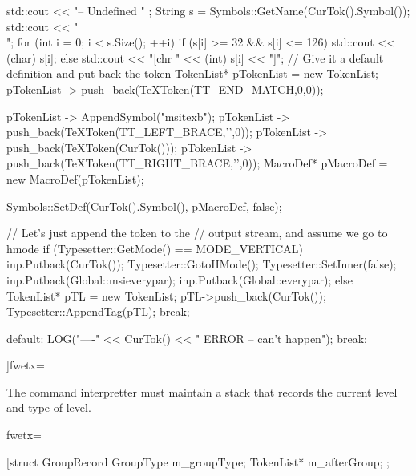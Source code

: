 {{{{{        std::cout << "\n-- Undefined " ;
        String s = Symbols::GetName(CurTok().Symbol());
        std::cout << "\\";
        for (int i = 0; i < s.Size(); ++i){
          if (s[i] >= 32 && s[i] <= 126){
             std::cout << (char) s[i];
          } else {
             std::cout << "[chr " << (int) s[i] << "]";
          }
        }
        // Give it a default definition and put back the token
        TokenList* pTokenList = new TokenList;
        pTokenList -> push_back(TeXToken(TT_END_MATCH,0,0));

        pTokenList -> AppendSymbol("msitexb");
        pTokenList -> push_back(TeXToken(TT_LEFT_BRACE,'{',0));
        pTokenList -> push_back(TeXToken(CurTok()));
        pTokenList -> push_back(TeXToken(TT_RIGHT_BRACE,'}',0));
        MacroDef* pMacroDef = new MacroDef(pTokenList);

        Symbols::SetDef(CurTok().Symbol(), pMacroDef, false);

        // Let's just append the token to the
        // output stream, and assume we go to hmode
        if (Typesetter::GetMode() == MODE_VERTICAL){
           inp.Putback(CurTok());
           Typesetter::GotoHMode();
           Typesetter::SetInner(false);
           inp.Putback(Global::msieverypar);
           inp.Putback(Global::everypar);
        } else {
           TokenList* pTL = new TokenList;
           pTL->push_back(CurTok());
           Typesetter::AppendTag(pTL);
        }
        break;
      }
      default:
        LOG("\n----" << CurTok()
                     << " ERROR -- can't happen");
        break;
   }
]fwetx=%
\fwcdef 
\fwbeginmacronotes
{}
\fwendmacronotes
\fwendmacro




The command interpretter must maintain a stack that records the current
level and type of level.

\fwbeginmacro
{}\fwplusequals \fwodef {}fwetx=%
\fwcdef 
\fwbeginmacronotes
{}
\fwendmacronotes
\fwendmacro


\fwbeginmacro
{}\fwplusequals \fwodef \fwbtx[struct GroupRecord {
   GroupType  m_groupType;
   TokenList* m_afterGroup;
};

}}}
